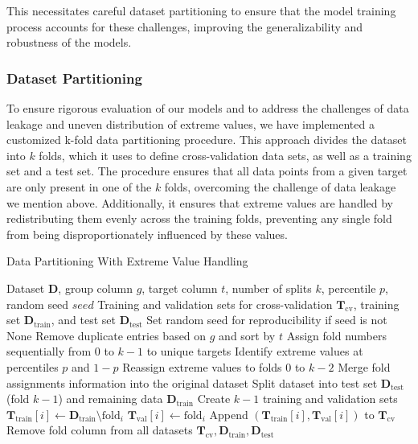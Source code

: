 This necessitates careful dataset partitioning to ensure that the model training process accounts for these challenges, improving the generalizability and robustness of the models.

\subsubsection{Dataset Partitioning}\label{subsubsec:dataset_partitioning}
To ensure rigorous evaluation of our models and to address the challenges of data leakage and uneven distribution of extreme values, we have implemented a customized k-fold data partitioning procedure. 
This approach divides the dataset into $k$ folds, which it uses to define cross-validation data sets, as well as a training set and a test set.
The procedure ensures that all data points from a given target are only present in one of the $k$ folds, overcoming the challenge of data leakage we mention above.
Additionally, it ensures that extreme values are handled by redistributing them evenly across the training folds, preventing any single fold from being disproportionately influenced by these values.

\begin{algorithm}
\caption{Data Partitioning With Extreme Value Handling}
\label{alg:custom_kfold_cv}
\begin{algorithmic}[1]
\Require Dataset $\mathbf{D}$, group column $g$, target column $t$, number of splits $k$, percentile $p$, random seed $\textit{seed}$
\Ensure Training and validation sets for cross-validation $\mathbf{T}_\text{cv}$, training set $\mathbf{D}_\text{train}$, and test set $\mathbf{D}_\text{test}$
\State \label{line:seed} Set random seed for reproducibility if $\text{seed}$ is not None
\State \label{line:remove_duplicates} Remove duplicate entries based on $g$ and sort by $t$
\State \label{line:assign_folds} Assign fold numbers sequentially from 0 to $k-1$ to unique targets
    \State \label{line:identify_extremes} Identify extreme values at percentiles $p$ and $1-p$
    \State \label{line:reassign_extremes} Reassign extreme values to folds $0$ to $k-2$
\EndIf
\State \label{line:merge_folds} Merge fold assignments information into the original dataset
\State \label{line:split_dataset} Split dataset into test set $\mathbf{D}_\text{test}$ (fold $k-1$) and remaining data $\mathbf{D}_\text{train}$
\State \label{line:create_folds} Create $k-1$ training and validation sets
    \State $\mathbf{T}_\text{train}[i] \gets \mathbf{D}_\text{train} \setminus \text{fold}_i$
    \State $\mathbf{T}_\text{val}[i] \gets \text{fold}_i$
    \State Append $(\mathbf{T}_\text{train}[i], \mathbf{T}_\text{val}[i])$ to $\mathbf{T}_\text{cv}$
\EndFor
\State \label{line:remove_fold_column} Remove fold column from all datasets
\State \Return $\mathbf{T}_\text{cv}, \mathbf{D}_\text{train}, \mathbf{D}_\text{test}$
\end{algorithmic}
\end{algorithm}


